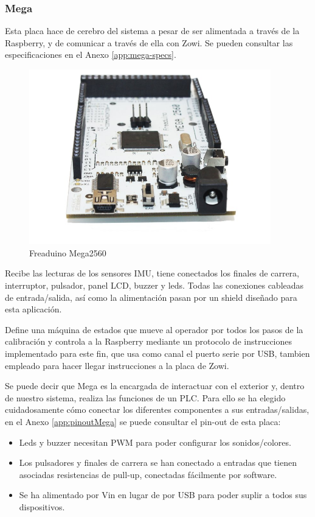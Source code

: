 \subsubsection{Mega}
Esta placa hace de cerebro del sistema a pesar de ser alimentada a través de la Raspberry, y de comunicar a través de ella con Zowi. Se pueden consultar las especificaciones en el Anexo \ref{app:mega-specs}.

\begin{figure}
\centering
\includegraphics[width=105mm]{Figures/arduinoMega}
\caption{Freaduino Mega2560}
\label{fig:arduinoMega}
\end{figure}

Recibe las lecturas de los sensores IMU, tiene conectados los finales de carrera, interruptor, pulsador, panel LCD, buzzer y leds. Todas las conexiones cableadas de entrada/salida, así como la alimentación pasan por un shield diseñado para esta aplicación.

Define una máquina de estados que mueve al operador por todos los pasos de la calibración y controla a la Raspberry mediante un protocolo de instrucciones implementado para este fin, que usa como canal el puerto serie por USB, tambien empleado para hacer llegar instrucciones a la placa de Zowi.

Se puede decir que Mega es la encargada de interactuar con el exterior y, dentro de nuestro sistema, realiza las funciones de un PLC. Para ello se ha elegido cuidadosamente cómo conectar los diferentes componentes a sus entradas/salidas, en el Anexo \ref{app:pinoutMega} se puede consultar el pin-out de esta placa:
\begin{itemize}
  \item Leds y buzzer necesitan PWM para poder configurar los sonidos/colores.
  \item Los pulsadores y finales de carrera se han conectado a entradas que tienen asociadas resistencias de pull-up, conectadas fácilmente por software.
  \item Se ha alimentado por Vin en lugar de por USB para poder suplir a todos sus dispositivos.
\end{itemize}

